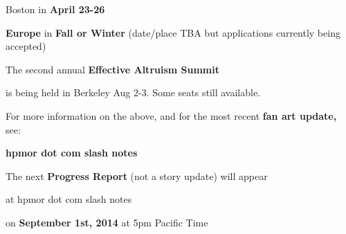 Boston in \textbf{April 23-26}

\textbf{Europe} in \textbf{Fall or Winter} (date/place TBA but applications currently being accepted)

The second annual \textbf{Effective Altruism Summit}

is being held in Berkeley Aug 2-3. Some seats still available.

For more information on the above, and for the most recent \textbf{fan art update,} see:

\textbf{hpmor dot com slash notes}

The next \textbf{Progress Report} (not a story update) will appear

at hpmor dot com slash notes

on \textbf{September 1st, 2014} at 5pm Pacific Time
